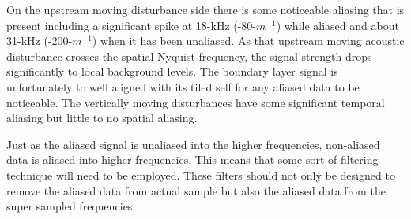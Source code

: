 On the upstream moving disturbance side there is some noticeable aliasing that is present including a significant spike at 18-kHz (-80-$m^{-1}$) while aliased and about 31-kHz (-200-$m^{-1}$) when it has been unaliased.
As that upstream moving acoustic disturbance crosses the spatial Nyquist frequency, the signal strength drops significantly to local background levels.
The boundary layer signal is unfortunately to well aligned with its tiled self for any aliased data to be noticeable.
The vertically moving disturbances have some significant temporal aliasing but little to no spatial aliasing.

Just as the aliased signal is unaliased into the higher frequencies, non-aliased data is aliased into higher frequencies.
This means that some sort of filtering technique will need to be employed.
These filters should not only be designed to remove the aliased data from actual sample but also the aliased data from the super sampled frequencies.


%
